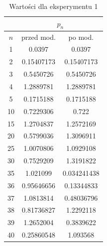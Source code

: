 \documentclass[12pt]{article}
\begin{document}
\begin{table}[!hbt]
\centering
\footnotesize
    \label{tab:table6}
    \begin{tabular}{|c|c|c|}
    		\hline
    		& \multicolumn{2}{|c|}{$p_n$} \\
    		\hline
    		$n$ & przed mod. & po mod.\\
    		\hline
		\hline
1 & 0.0397 & 0.0397\\
\hline
2 & 0.15407173 & 0.15407173\\
\hline
3 & 0.5450726 & 0.5450726\\
\hline
4 & 1.2889781 & 1.2889781\\
\hline
5 & 0.1715188 & 0.1715188\\
\hline
\hline
10 & 0.7229306 & 0.722\\
\hline
15 & 1.2704837 & 1.2572169\\
\hline
20 & 0.5799036 & 1.3096911\\
\hline
25 & 1.0070806 & 1.0929108\\
\hline
30 & 0.7529209 & 1.3191822\\
\hline
\hline
35 & 1.021099 & 0.034241438\\
\hline
36 & 0.95646656 & 0.13344833\\
\hline
37 & 1.0813814 & 0.48036796\\
\hline
38 & 0.81736827 & 1.2292118\\
\hline
39 & 1.2652004 & 0.3839622\\
\hline
40 & 0.25860548 & 1.093568\\
\hline
    \end{tabular}
    \caption{Wartości dla eksperymentu 1}
\end{table}
\end{document}
